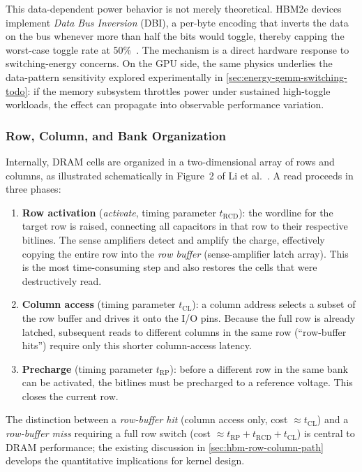 This data-dependent power behavior is not merely theoretical. HBM2e devices
implement \emph{Data Bus Inversion} (DBI), a per-byte encoding that inverts
the data on the bus whenever more than half the bits would toggle, thereby
capping the worst-case toggle rate at 50\%~\cite{micron2021hbm2e}. The
mechanism is a direct hardware response to switching-energy concerns.
On the GPU side, the same physics underlies the data-pattern sensitivity
explored experimentally in \cref{sec:energy-gemm-switching-todo}: if the
memory subsystem throttles power under sustained high-toggle workloads, the
effect can propagate into observable performance variation.

\subsubsection{Row, Column, and Bank Organization}\label{sec:dram-organization}

Internally, DRAM cells are organized in a two-dimensional array of rows and
columns, as illustrated schematically in Figure~2
of Li et al.~\cite{li2018highspeed-dram}. A read proceeds in three phases:

\begin{enumerate}
  \item \textbf{Row activation} (\emph{activate}, timing parameter
    $t_\text{RCD}$): the wordline for the target row is raised, connecting
    all capacitors in that row to their respective bitlines. The sense
    amplifiers detect and amplify the charge, effectively copying the entire
    row into the \emph{row buffer} (sense-amplifier latch array). This is the
    most time-consuming step and also restores the cells that were
    destructively read.
  \item \textbf{Column access} (timing parameter $t_\text{CL}$): a column
    address selects a subset of the row buffer and drives it onto the I/O
    pins. Because the full row is already latched, subsequent reads to
    different columns in the same row (``row-buffer hits'') require only this
    shorter column-access latency.
  \item \textbf{Precharge} (timing parameter $t_\text{RP}$): before a
    different row in the same bank can be activated, the bitlines must be
    precharged to a reference voltage. This closes the current row.
\end{enumerate}

The distinction between a \emph{row-buffer hit} (column access only,
cost $\approx t_\text{CL}$) and a \emph{row-buffer miss} requiring a full
row switch (cost $\approx t_\text{RP} + t_\text{RCD} + t_\text{CL}$) is
central to DRAM performance; the existing discussion in
\cref{sec:hbm-row-column-path} develops the quantitative implications for
kernel design.

